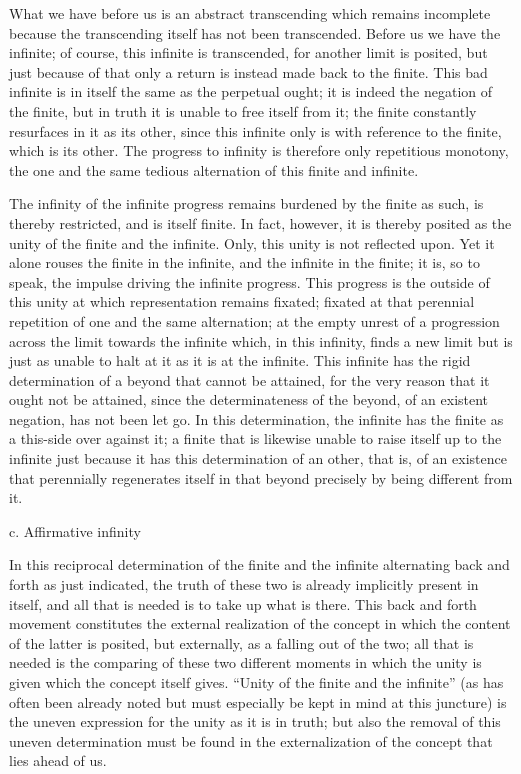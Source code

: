 What we have before us is an abstract transcending
which remains incomplete because the transcending
itself has not been transcended.
Before us we have the infinite;
of course, this infinite is transcended,
for another limit is posited,
but just because of that only a return
is instead made back to the finite.
This bad infinite is in itself
the same as the perpetual ought;
it is indeed the negation of the finite,
but in truth it is unable to free itself from it;
the finite constantly resurfaces in it as its other,
since this infinite only is with reference to the finite,
which is its other.
The progress to infinity is
therefore only repetitious monotony,
the one and the same tedious
alternation of this finite and infinite.

The infinity of the infinite progress
remains burdened by the finite as such,
is thereby restricted, and is itself finite.
In fact, however, it is thereby posited as
the unity of the finite and the infinite.
Only, this unity is not reflected upon.
Yet it alone rouses the finite in the infinite,
and the infinite in the finite;
it is, so to speak, the impulse
driving the infinite progress.
This progress is the outside of this unity
at which representation remains fixated;
fixated at that perennial repetition
of one and the same alternation;
at the empty unrest of a progression
across the limit towards the infinite
which, in this infinity, finds a new limit
but is just as unable to halt at it
as it is at the infinite.
This infinite has the rigid determination
of a beyond that cannot be attained,
for the very reason that it ought not be attained,
since the determinateness of the beyond,
of an existent negation, has not been let go.
In this determination, the infinite has
the finite as a this-side over against it;
a finite that is likewise unable
to raise itself up to the infinite
just because it has this determination of an other,
that is, of an existence that perennially
regenerates itself in that beyond
precisely by being different from it.

c. Affirmative infinity

In this reciprocal determination of the finite and the infinite
alternating back and forth as just indicated,
the truth of these two is already implicitly present in itself,
and all that is needed is to take up what is there.
This back and forth movement constitutes the external realization
of the concept in which the content of the latter is posited,
but externally, as a falling out of the two;
all that is needed is the comparing of these two different moments
in which the unity is given which the concept itself gives.
“Unity of the finite and the infinite”
(as has often been already noted
but must especially be kept in mind at this juncture)
is the uneven expression for the unity as it is in truth;
but also the removal of this uneven determination must be
found in the externalization of the concept that lies ahead of us.

